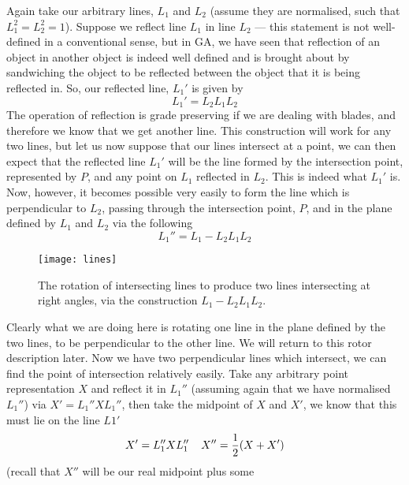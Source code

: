 Again take our arbitrary lines, $L_1$ and $L_2$ (assume
they are normalised, such that $L_1^2=L_2^2=1$). Suppose
we reflect line $L_1$ in line $L_2$ --- this statement is
not well-defined in a conventional sense, but in
GA, we have seen that reflection of an
object in another object is indeed well defined and is
brought about by sandwiching the object to be reflected
between the object that it is being reflected in. So, our
reflected line, $L_1'$ is given by
%
\[  L_1' = L_2L_1L_2  \]
%
The operation of reflection is grade preserving if we are
dealing with blades, and therefore we know that we get
another line. This construction will work for any two
lines, but let us now suppose that our lines intersect at
a point, we can then expect that the reflected line
$L_1'$ will be the line formed by the intersection point,
represented by $P$, and any point on $L_1$ reflected in $L_2$. This is
indeed what $L_1'$ is. Now, however, it becomes possible
very easily to form the line which is perpendicular to
$L_2$, passing through the intersection point, $P$, and
in the plane defined by $L_1$ and $L_2$ via the following
%
\begin{equation}
 L_1'' =  L_1 - L_2L_1L_2
\end{equation}
%
%
%
\begin{figure}
\centerline{
\texttt{[image: lines]}
} \caption{The rotation of intersecting lines to
produce two lines intersecting at right angles, via the
construction $L_1-L_2L_1L_2$.} \label{intersect_lines}
\end{figure}
Clearly what we are doing here is rotating one line in
the plane defined by the two lines,  to be perpendicular
to the other line. We will return to this rotor
description later.  Now we have two perpendicular lines
which intersect, we can find the point of intersection
relatively easily. Take any arbitrary point representation $X$ and
reflect it in $L_1''$ (assuming again that we have
normalised $L_1''$) via $X' = L_1''XL_1''$, then take the
midpoint of $X$ and $X'$, we know that this must lie on
the line $L1'$
%
\[ X' = L_1''XL_1'' \;\;\;\; X'' = \frac{1}{2} (X + X')   \]
%
(recall that $X''$ will be our real midpoint plus some
